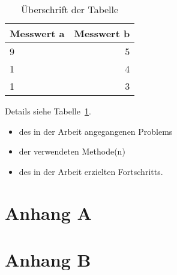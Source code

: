 \documentclass[oneside]{ausarbeitung}
\begin{document}
\begin{table}[htbp]
\centering
\begin{tabular}{|l|r|}
\hline
\textbf{Messwert a} & \textbf{Messwert b} \\ \hline
9 & 5 \\ \hline
1 & 4 \\ \hline
1 & 3 \\ \hline
\end{tabular}
\caption{Überschrift der Tabelle}
\label{tab:my-table}
\end{table}

Details siehe Tabelle~\ref{tab:my-table}.


  \begin{itemize}
    \item des in der Arbeit angegangenen Problems
    \item der verwendeten Methode(n)
    \item des in der Arbeit erzielten Fortschritts.
  \end{itemize}

\appendix

\printbibliography[heading=bibintoc]

\chapter{Anhang A}

\Blindtext

\chapter{Anhang B}

\Blindtext
\end{document}
